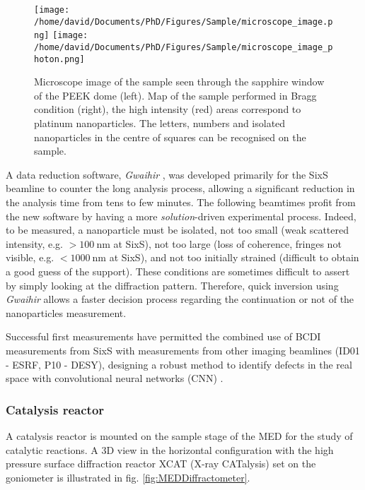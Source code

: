 \begin{figure}[!htb]
    \centering
    \texttt{[image: /home/david/Documents/PhD/Figures/Sample/microscope\_image.png]}
    \texttt{[image: /home/david/Documents/PhD/Figures/Sample/microscope\_image\_photon.png]}
    \caption{
        Microscope image of the sample seen through the sapphire window of the PEEK dome (left).
        Map of the sample performed in Bragg condition (right), the high intensity (red) areas correspond to platinum nanoparticles.
        The letters, numbers and isolated nanoparticles in the centre of squares can be recognised on the sample.
    }
    \label{fig:SampleMapping}
\end{figure}

A data reduction software, \textit{Gwaihir} \parencite{Simonne2022}, was developed primarily for the SixS beamline to counter the long analysis process, allowing a significant reduction in the analysis time from tens to few minutes.
The following beamtimes profit from the new software by having a more \textit{solution}-driven experimental process.
Indeed, to be measured, a nanoparticle must be isolated, not too small (weak scattered intensity, e.g. $>\qty{100}{\nm}$ at SixS), not too large (loss of coherence, fringes not visible, e.g. $<\qty{1000}{\nm}$ at SixS), and not too initially strained (difficult to obtain a good guess of the support).
These conditions are sometimes difficult to assert by simply looking at the diffraction pattern.
Therefore, quick inversion using \textit{Gwaihir} allows a faster decision process regarding the continuation or not of the nanoparticles measurement.

Successful first measurements have permitted the combined use of BCDI measurements from SixS with measurements from other imaging beamlines (ID01 - ESRF, P10 - DESY), designing a robust method to identify defects in the real space with convolutional neural networks (CNN) \parencite{Lim2021}.

\subsubsection{Catalysis reactor}\label{sec:XCAT}

A catalysis reactor is mounted on the sample stage of the MED for the study of catalytic reactions.
A 3D view in the horizontal configuration with the high pressure surface diffraction reactor XCAT (X-ray CATalysis) set on the goniometer is illustrated in fig. \ref{fig:MEDDiffractometer}.

